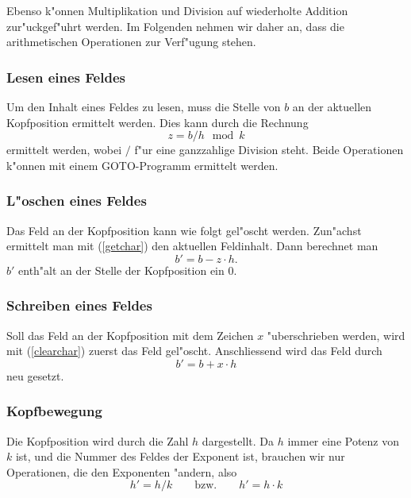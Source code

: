 Ebenso k"onnen Multiplikation und Division auf wiederholte Addition
zur"uckgef"uhrt werden.
Im Folgenden nehmen wir daher an, dass die arithmetischen Operationen
zur Verf"ugung stehen.

\subsubsection{Lesen eines Feldes}
Um den Inhalt eines Feldes zu lesen, muss die Stelle von $b$ an der
aktuellen Kopfposition ermittelt werden.
Dies kann durch die Rechnung
\begin{equation}
z=b / h \mod k
\label{getchar}
\end{equation}
ermittelt werden, wobei $/$ f"ur eine ganzzahlige Division steht.
Beide Operationen k"onnen mit einem GOTO-Programm ermittelt werden.

\subsubsection{L"oschen eines Feldes}
Das Feld an der Kopfposition kann wie folgt gel"oscht werden.
Zun"achst ermittelt man mit (\ref{getchar}) den aktuellen Feldinhalt.
Dann berechnet man
\begin{equation}
b' = b - z\cdot h.
\label{clearchar}
\end{equation}
$b'$ enth"alt an der Stelle der Kopfposition ein $0$.

\subsubsection{Schreiben eines Feldes}
Soll das Feld an der Kopfposition mit dem Zeichen $x$ "uberschrieben
werden, wird mit (\ref{clearchar}) zuerst das Feld gel"oscht.
Anschliessend wird das Feld durch
\[
b'=b+x\cdot h
\]
neu gesetzt.

\subsubsection{Kopfbewegung}
Die Kopfposition wird durch die Zahl $h$ dargestellt.
Da $h$ immer eine Potenz von $k$ ist, und die Nummer des Feldes der
Exponent ist, brauchen wir nur Operationen, die den Exponenten
"andern, also
\[
h'=h/k\qquad\text{bzw.}\qquad h'=h\cdot k
\]

